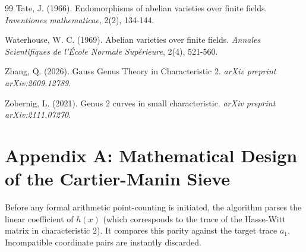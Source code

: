 \documentclass[letterpaper, 11pt]{article}
\begin{document}
\begin{thebibliography}{99}
Tate, J. (1966). Endomorphisms of abelian varieties over finite fields. \textit{Inventiones mathematicae}, 2(2), 134-144.

Waterhouse, W. C. (1969). Abelian varieties over finite fields. \textit{Annales Scientifiques de l'\'{E}cole Normale Sup\'{e}rieure}, 2(4), 521-560.

Zhang, Q. (2026). Gauss Genus Theory in Characteristic 2. \textit{arXiv preprint arXiv:2609.12789}.

Zobernig, L. (2021). Genus 2 curves in small characteristic. \textit{arXiv preprint arXiv:2111.07270}.

\end{thebibliography}

\appendix
\section{Appendix A: Mathematical Design of the Cartier-Manin Sieve}
Before any formal arithmetic point-counting is initiated, the algorithm parses the linear coefficient of $h(x)$ (which corresponds to the trace of the Hasse-Witt matrix in characteristic 2). It compares this parity against the target trace $a_1$. Incompatible coordinate pairs are instantly discarded.
\end{document}
